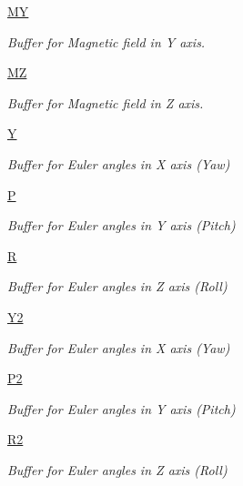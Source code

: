 \begin{DoxyCompactItemize}
\hyperlink{classmain_1_1_main_window_aba40307f35350f664481c72b034e7bf8}{M\-Y}
\begin{DoxyCompactList}\small\item\em Buffer for Magnetic field in Y axis. \end{DoxyCompactList}\item 
\hyperlink{classmain_1_1_main_window_a3f1d2bc16eb2b7a565f2784e4741be7b}{M\-Z}
\begin{DoxyCompactList}\small\item\em Buffer for Magnetic field in Z axis. \end{DoxyCompactList}\item 
\hyperlink{classmain_1_1_main_window_a7b804cc35c413c631e3bb870bc123232}{Y}
\begin{DoxyCompactList}\small\item\em Buffer for Euler angles in X axis (Yaw) \end{DoxyCompactList}\item 
\hyperlink{classmain_1_1_main_window_a9000507d15f50881c7cfbd1d562e0feb}{P}
\begin{DoxyCompactList}\small\item\em Buffer for Euler angles in Y axis (Pitch) \end{DoxyCompactList}\item 
\hyperlink{classmain_1_1_main_window_a5a2a696186b46f2c1ab6d843781717bb}{R}
\begin{DoxyCompactList}\small\item\em Buffer for Euler angles in Z axis (Roll) \end{DoxyCompactList}\item 
\hyperlink{classmain_1_1_main_window_a7a3bc2d61217962905847f0badb89385}{Y2}
\begin{DoxyCompactList}\small\item\em Buffer for Euler angles in X axis (Yaw) \end{DoxyCompactList}\item 
\hyperlink{classmain_1_1_main_window_a27dae11aa90ae75ad58556b5f872d05e}{P2}
\begin{DoxyCompactList}\small\item\em Buffer for Euler angles in Y axis (Pitch) \end{DoxyCompactList}\item 
\hyperlink{classmain_1_1_main_window_a1a7ef29e7427ad606b2aacd8e1993e66}{R2}
\begin{DoxyCompactList}\small\item\em Buffer for Euler angles in Z axis (Roll) \end{DoxyCompactList}\item 

\end{DoxyCompactItemize}
